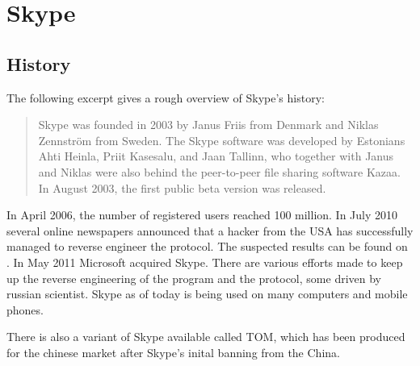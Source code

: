 \section{Skype}
\subsection{History}
The following excerpt\cite{wiki:skype} gives a rough overview of Skype's history:
\begin{quote}
Skype was founded in 2003 by Janus Friis from Denmark and Niklas Zennström from Sweden.
The Skype software was developed by Estonians Ahti Heinla, Priit Kasesalu, and Jaan Tallinn, 
who together with Janus and Niklas were also behind the peer-to-peer file sharing software 
Kazaa. In August 2003, the first public beta version was released.
\end{quote}
In April 2006, the number of registered users reached 100 million.
In July 2010 several online newspapers announced that a hacker from the USA
has successfully managed to reverse engineer the
protocol. The suspected results can be found on \cite{skype:source}.
In May 2011 Microsoft acquired Skype. There are various efforts made to 
keep up the reverse engineering of the program and the 
protocol, some driven by russian scientist.
Skype as of today is being used on many computers and mobile phones.

There is also a variant of Skype available called TOM, which has been produced
for the chinese market after Skype's inital banning from the China.

